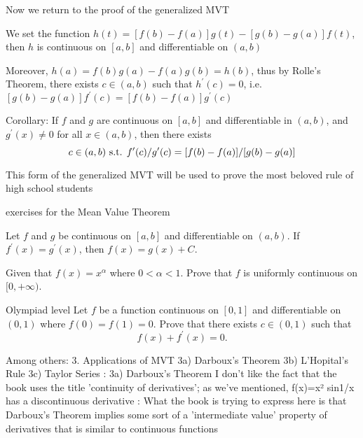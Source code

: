 Now we return to the proof of the generalized MVT

We set the function $h(t)=[f(b)-f(a)]g(t)-[g(b)-g(a)]f(t)$, then $h$ is continuous on $[a,b]$ and differentiable on $(a,b)$

Moreover, $h(a)=f(b)g(a)-f(a)g(b)=h(b)$, thus by Rolle's Theorem, there exists $c\in(a,b)$ such that $h^\prime(c)=0$, i.e. $[g(b)-g(a)]f^\prime(c)=[f(b)-f(a)]g^\prime(c)$

Corollary: If $f$ and $g$ are continuous on $[a,b]$ and differentiable in $(a,b)$, and $g^\prime(x)\neq0$ for all $x\in(a,b)$, then there exists \[ c\in(a,b) \text{ s.t. } f^\prime(c)/g^\prime(c)=[f(b)-f(a)]/[g(b)-g(a)] \]

This form of the generalized MVT will be used to prove the most beloved rule of high school students

exercises for the Mean Value Theorem

\begin{exercise}{}{}
Let $f$ and $g$ be continuous on $[a,b]$ and differentiable on $(a,b)$. If $f^\prime(x)=g^\prime(x)$, then $f(x)=g(x)+C$.
\end{exercise}

\begin{exercise}{}{}
Given that $f(x)=x^\alpha$ where $0<\alpha<1$. Prove that $f$ is uniformly continuous on $[0,+\infty)$.
\end{exercise}

\begin{exercise}{Olympiad level}{}
Let $f$ be a function continuous on $[0,1]$ and differentiable on $(0,1)$ where $f(0)=f(1)=0$. Prove that there exists $c\in(0,1)$ such that
\[ f(x)+f^\prime(x)=0. \]
\end{exercise}

Among others:
3. Applications of MVT
3a) Darboux's Theorem
3b) L'Hopital's Rule
3c) Taylor Series
:
3a) Darboux's Theorem
I don't like the fact that the book uses the title 'continuity of derivatives'; as we've mentioned, f(x)=x² sin1/x has a discontinuous derivative
:
What the book is trying to express here is that Darboux's Theorem implies some sort of a 'intermediate value' property of derivatives that is similar to continuous functions

